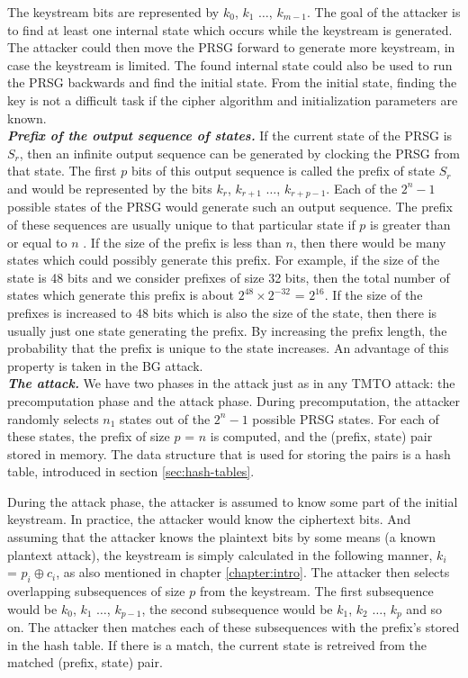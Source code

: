 The keystream bits are represented by $k_0$, $k_1$ $\ldots$, $k_{m-1}$. The goal of the attacker is to find at least one internal state which occurs while the keystream is generated. The attacker could then move the PRSG forward to generate more keystream, in case the keystream is limited. The found internal state could also be used to run the PRSG backwards and find the initial state. From the initial state, finding the key is not a difficult task if the cipher algorithm and initialization parameters are known.\\

\textit{\textbf{Prefix of the output sequence of states.}} If the current state of the PRSG is $S_r$, then an infinite output sequence can be generated by clocking the PRSG from that state. The first $p$ bits of this output sequence is called the prefix of state $S_r$ and would be represented by the bits $k_r$, $k_{r+1}$ $\ldots$, $k_{r+p-1}$. Each of the $2^{n} - 1$ possible states of the PRSG would generate such an output sequence. The prefix of these sequences are usually unique to that particular state if $p$ is greater than or equal to $n$ \cite{biryukov2000rtc}. If the size of the prefix is less than $n$, then there would be many states which could possibly generate this prefix. For example, if the size of the state is 48 bits and we consider prefixes of size 32 bits, then the total number of states which generate this prefix is about $2^{48} \times 2^{-32}$ = $2^{16}$. If the size of the prefixes is increased to 48 bits which is also the size of the state, then there is usually just one state generating the prefix. By increasing the prefix length, the probability that the prefix is unique to the state increases. An advantage of this property is taken in the BG attack.\\

\textit{\textbf{The attack.}} We have two phases in the attack just as in any TMTO attack: the precomputation phase and the attack phase. During precomputation, the attacker randomly selects $n_1$ states out of the $2^n - 1$ possible PRSG states. For each of these states, the prefix of size $p$ = $n$ is computed, and the (prefix, state) pair stored in memory. The data structure that is used for storing the pairs is a hash table, introduced in section \ref{sec:hash-tables}.

During the attack phase, the attacker is assumed to know some part of the initial keystream. In practice, the attacker would know the ciphertext bits. And assuming that the attacker knows the plaintext bits by some means (a known plantext attack), the keystream is simply calculated in the following manner, $k_i$ = $p_i \oplus c_i$, as also mentioned in chapter \ref{chapter:intro}. The attacker then selects overlapping subsequences of size $p$ from the keystream. The first subsequence would be $k_0$, $k_1$ $\ldots$, $k_{p-1}$, the second subsequence would be $k_1$, $k_2$ $\ldots$, $k_{p}$ and so on. The attacker then matches each of these subsequences with the prefix's stored in the hash table. If there is a match, the current state is retreived from the matched (prefix, state) pair.\\


